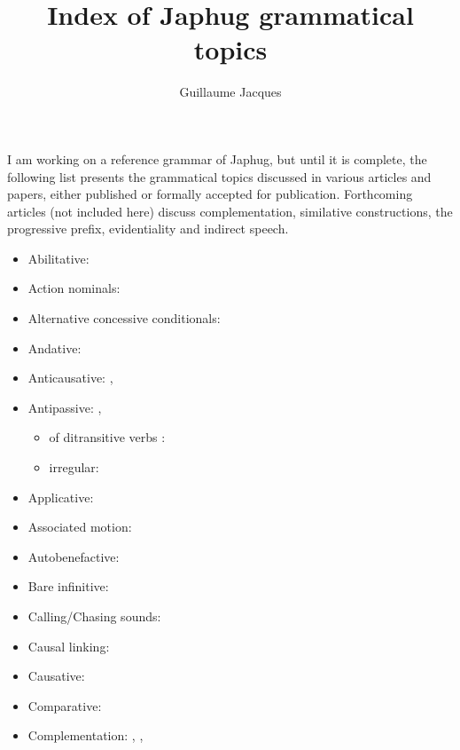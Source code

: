 \documentclass[oldfontcommands,oneside,a4paper,11pt]{article}
\begin{document}
 
\title{Index of Japhug grammatical topics}
\author{Guillaume Jacques}
\maketitle

I am working on a reference grammar of Japhug, but until it is complete, the following list presents the grammatical topics discussed in various articles and papers, either published or formally accepted for publication. Forthcoming articles (not included here) discuss complementation, similative constructions, the progressive prefix, evidentiality and indirect speech.

\begin{itemize}
\item Abilitative: \citet{jacques15causative}
\item Action nominals: \citet[7]{jacques14antipassive}
\item Alternative concessive conditionals: \citet[298]{jacques14linking}
\item Andative: \citet[200-6]{jacques13harmonization}
\item Anticausative: \citet[213-4]{jacques12demotion}, \citet{jacques15spontaneous}
\item Antipassive: \citet[215-6]{jacques12demotion}, \citet{jacques14antipassive}
\begin{itemize}
\item of ditransitive verbs : \citet[13-4]{jacques14antipassive}
\item irregular:  \citet[18-20]{jacques14antipassive}
\end{itemize}
\item Applicative: \citet{jacques13tropative}
\item Associated motion: \citet[200-6]{jacques13harmonization}
\item Autobenefactive: \citet{jacques15spontaneous}
\item Bare infinitive: \citet[9]{jacques14antipassive}
\item Calling/Chasing sounds:   \citet[283-4]{japhug14ideophones}
\item Causal linking:  \citet[303-6]{jacques14linking}
\item Causative: \citet{jacques15causative}
\item Comparative: \citet{jacques16comparative}
\item Complementation: \citet{jacques08}, , \citet{jacques16sketch}
\begin{itemize}

\end{itemize}
\end{itemize}
\end{document}
